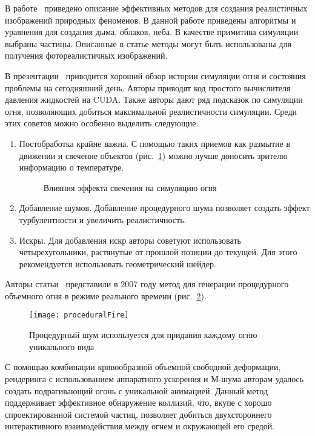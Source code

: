 В работе~\cite{NaturalPhenomena} приведено описание эффективных методов для
создания реалистичных изображений природных феноменов. В данной работе приведены
алгоритмы и уравнения для создания дыма, облаков, неба. В качестве примитива
симуляции выбраны частицы. Описанные в статье методы могут быть использованы для
получения фотореалистичных изображений.

В презентации~\cite{RealTimeNVIDIA} приводится хороший обзор истории симуляции
огня и состояния проблемы на сегодняшний день. Авторы приводят код простого
вычислителя давления жидкостей на CUDA\@. Также авторы дают ряд подсказок по
симуляции огня, позволяющих добиться максимальной реалистичности симуляции.
Среди этих советов можно особенно выделить следующие:
\begin{enumerate}
    \item Постобработка крайне важна. С помощью таких приемов как размытие в
        движении и свечение объектов (рис.~\ref{fig:GlowEffect}) можно лучше
        доносить зрителю информацию о температуре.
    \begin{figure}[htb]
        \centering
        \qquad
        \caption{Влияния эффекта свечения на симуляцию огня}%
        \label{fig:GlowEffect}%
    \end{figure}
    \item Добавление шумов. Добавление процедурного шума позволяет создать
        эффект турбулентности и увеличить реалистичность.
    \item Искры. Для добавления искр авторы советуют использовать
        четырехугольники, растянутые от прошлой позиции до текущей. Для этого
        рекомендуется использовать геометрический шейдер.
\end{enumerate}

Авторы статьи~\cite{RealTimeVolumetric} представили в 2007 году метод для
генерации процедурного объемного огня в режиме реального времени
(рис.~\ref{fig:proceduralFire}).
\begin{figure}[htb]
	\centering
    \texttt{[image: proceduralFire]}
    \caption{Процедурный шум используется для придания каждому огню уникального
    вида}%
    \label{fig:proceduralFire}
\end{figure}
С помощью комбинации кривообразной объемной свободной деформации, рендеринга с
использованием аппаратного ускорения и М-шума авторам удалось создать
подрагивающий огонь с уникальной анимацией. Данный метод поддерживает
эффективное обнаружение коллизий, что, вкупе с хорошо спроектированной системой
частиц, позволяет добиться двухстороннего интерактивного
взаимодействия между огнем и окружающей его средой.

